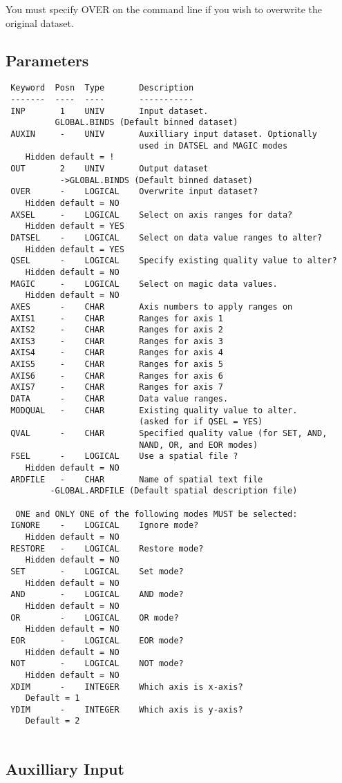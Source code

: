 \documentclass{book}
\renewcommand{\_}{{\tt\char'137}}     %
\begin{document}
You must specify OVER on the command line if you wish to
overwrite the original dataset.
 
\subsection{Parameters}
\begin{verbatim}
 Keyword  Posn  Type       Description
 -------  ----  ----       -----------
 INP       1    UNIV       Input dataset.
          GLOBAL.BINDS (Default binned dataset)
 AUXIN     -    UNIV       Auxilliary input dataset. Optionally
                           used in DATSEL and MAGIC modes
    Hidden default = !
 OUT       2    UNIV       Output dataset
           ->GLOBAL.BINDS (Default binned dataset)
 OVER      -    LOGICAL    Overwrite input dataset?
    Hidden default = NO
 AXSEL     -    LOGICAL    Select on axis ranges for data?
    Hidden default = YES
 DATSEL    -    LOGICAL    Select on data value ranges to alter?
    Hidden default = YES
 QSEL      -    LOGICAL    Specify existing quality value to alter?
    Hidden default = NO
 MAGIC     -    LOGICAL    Select on magic data values.
    Hidden default = NO
 AXES      -    CHAR       Axis numbers to apply ranges on
 AXIS1     -    CHAR       Ranges for axis 1
 AXIS2     -    CHAR       Ranges for axis 2
 AXIS3     -    CHAR       Ranges for axis 3
 AXIS4     -    CHAR       Ranges for axis 4
 AXIS5     -    CHAR       Ranges for axis 5
 AXIS6     -    CHAR       Ranges for axis 6
 AXIS7     -    CHAR       Ranges for axis 7
 DATA      -    CHAR       Data value ranges.
 MODQUAL   -    CHAR       Existing quality value to alter.
                           (asked for if QSEL = YES)
 QVAL      -    CHAR       Specified quality value (for SET, AND,
                           NAND, OR, and EOR modes)
 FSEL      -    LOGICAL    Use a spatial file ?
    Hidden default = NO
 ARDFILE   -    CHAR       Name of spatial text file
         -GLOBAL.ARDFILE (Default spatial description file)
 
  ONE and ONLY ONE of the following modes MUST be selected:
 IGNORE    -    LOGICAL    Ignore mode?
    Hidden default = NO
 RESTORE   -    LOGICAL    Restore mode?
    Hidden default = NO
 SET       -    LOGICAL    Set mode?
    Hidden default = NO
 AND       -    LOGICAL    AND mode?
    Hidden default = NO
 OR        -    LOGICAL    OR mode?
    Hidden default = NO
 EOR       -    LOGICAL    EOR mode?
    Hidden default = NO
 NOT       -    LOGICAL    NOT mode?
    Hidden default = NO
 XDIM      -    INTEGER    Which axis is x-axis?
    Default = 1
 YDIM      -    INTEGER    Which axis is y-axis?
    Default = 2
 
\end{verbatim}\subsection{Auxilliary Input}
\end{document}
